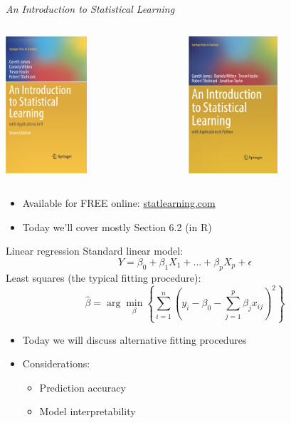 \documentclass{beamer}
\begin{document}
  \begin{frame}{\it An Introduction to Statistical Learning}
    \begin{columns}
      \begin{column}{0.5\textwidth}
        \centering
        \includegraphics[height = 2in]{images/isl_r.png}
      \end{column}
      \begin{column}{0.5\textwidth}
        \centering
        \includegraphics[height = 2in]{images/isl_python.png}
      \end{column}
    \end{columns}
    \vspace{6mm}
    \begin{itemize}
      \item Available for FREE online: \url{statlearning.com}
      \item Today we'll cover mostly Section 6.2 (in R)
    \end{itemize}
  \end{frame}

  \begin{frame}{Linear regression}
    Standard linear model:
    $$Y = \beta_0 + \beta_1 X_1 + ... + \beta_p X_p + \epsilon$$
    Least squares (the typical fitting procedure):
    $$\hat\beta = \arg\min_\beta \left\{ \sum_{i = 1}^n \left(y_i - \beta_0 - \sum_{j = 1}^p \beta_j x_{ij}\right)^2 \right\}$$
    \begin{itemize}
      \item Today we will discuss alternative fitting procedures
      \item Considerations:
      \begin{itemize}
        \item Prediction accuracy
        \item Model interpretability
      \end{itemize}
    \end{itemize}
  \end{frame}
\end{document}
